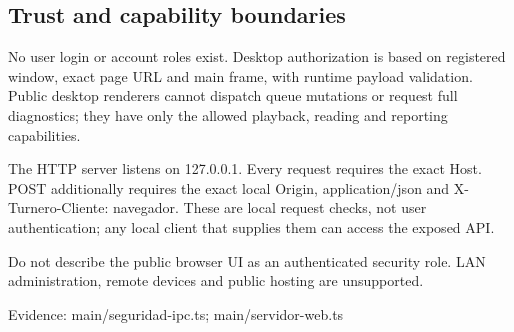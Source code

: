 \subsection{Trust and capability boundaries}

No user login or account roles exist. Desktop authorization is based on registered window, exact page URL and main frame, with runtime payload validation. Public desktop renderers cannot dispatch queue mutations or request full diagnostics; they have only the allowed playback, reading and reporting capabilities.

The HTTP server listens on 127.0.0.1. Every request requires the exact Host. POST additionally requires the exact local Origin, application/json and X-Turnero-Cliente: navegador. These are local request checks, not user authentication; any local client that supplies them can access the exposed API.

Do not describe the public browser UI as an authenticated security role. LAN administration, remote devices and public hosting are unsupported.

Evidence: main/seguridad-ipc.ts; main/servidor-web.ts
